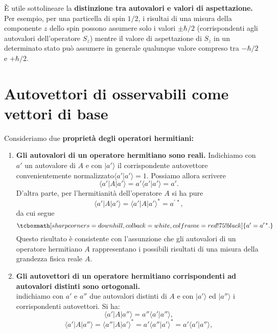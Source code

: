 \documentclass[a4paper,12pt,oneside]{book}
\begin{document}
È utile sottolineare la \textbf{distinzione tra autovalori e valori di aspettazione.} Per esempio, per una particella di spin $1/2$, i risultai di una misura della componente $z$ dello spin possono assumere solo i valori $\pm \hbar/2$ (corrispondenti agli autovalori dell'operatore $S_z$) mentre il valore di aspettazione di $S_z$ in un determinato stato può assumere in generale qualunque valore compreso tra $-\hbar /2$ e $+\hbar /2$.
\section{Autovettori di osservabili come vettori di base}
Consideriamo due \textbf{proprietà degli operatori hermitiani:}
\begin{enumerate}
\item \textbf{Gli autovalori di un operatore hermitiano sono reali.} Indichiamo con $a'$ un autovalore di $A$ e con $\vert a' \rangle $ il corrispondente autovettore convenientemente normalizzato$\langle a' \vert a' \rangle =1 $. Possiamo allora scrivere
	\begin{equation}
		\langle a' \vert A \vert a' \rangle = a' \langle a' \vert a' \rangle = a'.
	\end{equation}
D'altra parte, per l'hermitianità dell'operatore $A$ si ha pure
	\begin{equation}
		\langle a' \vert A \vert a' \rangle = \langle a' \vert A \vert a' \rangle  ^* = a^{\prime \, *},
	\end{equation}
da cui segue
	\begin{equation}
		\tcboxmath[sharp corners=downhill ,colback=white,colframe=red!75!black]{
			a'=a^{\prime \, *} .
			}
	\end{equation}
Questo risultato è consistente con l'assunzione che gli autovalori di un operatore hermitiano $A$ rappresentano i possibili risultati di una misura della grandezza fisica reale $A$.
\item \textbf{Gli autovettori di un operatore hermitiano corrispondenti ad autovalori distinti sono ortogonali.}\\
indichiamo con $a' $ e $a''$ due autovalori distinti di $A$ e con $\vert a' \rangle$ ed $\vert a'' \rangle$ i corrispondenti autovettori. Si ha:
	\begin{equation}
		\langle a' \vert A \vert a'' \rangle = a'' \langle a' \vert a'' \rangle ,
	\end{equation}
	\begin{equation}
		\langle a' \vert A \vert a'' \rangle = \langle a'' \vert A \vert a' \rangle ^* = a' \langle a'' \vert a' \rangle ^* = a' \langle a' \vert a'' \rangle ,

\end{equation}
\end{enumerate}
\end{document}
